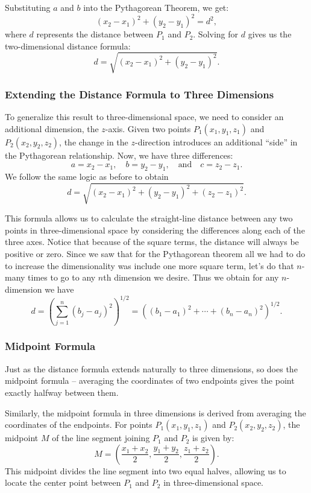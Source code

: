 \noindent Substituting \( a \) and \( b \) into the Pythagorean Theorem, we get:
\[
(x_2 - x_1)^2 + (y_2 - y_1)^2 = d^2,
\]
where \( d \) represents the distance between \( P_1 \) and \( P_2 \). Solving for \( d \) gives us the two-dimensional distance formula:
\[
d = \sqrt{(x_2 - x_1)^2 + (y_2 - y_1)^2}.
\]

\subsubsection*{Extending the Distance Formula to Three Dimensions}

To generalize this result to three-dimensional space, we need to consider an additional dimension, the \( z \)-axis. Given two points \( P_1(x_1, y_1, z_1) \) and \( P_2(x_2, y_2, z_2) \), the change in the \( z \)-direction introduces an additional ``side” in the Pythagorean relationship. Now, we have three differences:
\[
a = x_2 - x_1, \quad b = y_2 - y_1, \quad \text{and} \quad c = z_2 - z_1.
\]
\noindent We follow the same logic as before to obtain
\[
d = \sqrt{(x_2 - x_1)^2 + (y_2 - y_1)^2 + (z_2 - z_1)^2}.
\]

\noindent This formula allows us to calculate the straight-line distance between any two points in three-dimensional space by considering the differences along each of the three axes. Notice that because of the square terms, the distance will always be positive or zero. Since we saw that for the Pythagorean theorem all we had to do to increase the dimensionality was include one more square term,  let's do that $n$-many times to go to any $n$th dimension we desire. Thus we obtain for any $n$-dimension we have
\[
d = \left(\sum_{j=1}^{n} \left(b_j - a_j\right)^2 \right)^{1/2} = \left((b_1 - a_1)^2 + \cdots + (b_n - a_n)^2\right)^{1/2}.
\]

\subsubsection*{Midpoint Formula}
Just as the distance formula extends naturally to three dimensions, so does the midpoint formula -- averaging the coordinates of two endpoints gives the point exactly halfway between them.

Similarly, the midpoint formula in three dimensions is derived from averaging the coordinates of the endpoints. For points \( P_1(x_1, y_1, z_1) \) and \( P_2(x_2, y_2, z_2) \), the midpoint \( M \) of the line segment joining \( P_1 \) and \( P_2 \) is given by:
\[
M = \left( \frac{x_1 + x_2}{2}, \frac{y_1 + y_2}{2}, \frac{z_1 + z_2}{2} \right).
\]
This midpoint divides the line segment into two equal halves, allowing us to locate the center point between \( P_1 \) and \( P_2 \) in three-dimensional space.


